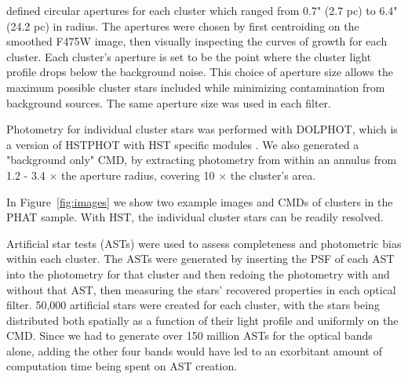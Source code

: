 \documentclass{emulateapj}
\begin{document}
\cite{Johnson15} defined circular apertures for each cluster which ranged from 0.7" (2.7 pc) to 6.4" (24.2 pc) in radius.  The apertures were chosen by first centroiding on the smoothed F475W image, then visually inspecting the curves of growth for each cluster.  Each cluster's aperture is set to be the point where the cluster light profile drops below the background noise.  This choice of aperture size allows the maximum possible cluster stars included while minimizing contamination from background sources.  The same aperture size was used in each filter.

Photometry for individual cluster stars was performed with DOLPHOT, which is a version of HSTPHOT with HST specific modules \citep{Dolphin00}.  We also generated a "background only" CMD, by extracting photometry from within an annulus from 1.2 - 3.4 $\times$ the aperture radius, covering 10 $\times$ the cluster's area.

In Figure~\ref{fig:images} we show two example images and CMDs of clusters in the PHAT sample.  With HST, the individual cluster stars can be readily resolved.


Artificial star tests (ASTs) were used to assess completeness and photometric bias within each cluster.  The ASTs were generated by inserting the PSF of each AST into the photometry for that cluster and then redoing the photometry with and without that AST, then measuring the stars' recovered properties in each optical filter.  50,000 artificial stars were created for each cluster, with the stars being distributed both spatially as a function of their light profile and uniformly on the CMD.  Since we had to generate over 150 million ASTs for the optical bands alone, adding the other four bands would have led to an exorbitant amount of computation time being spent on AST creation.
\end{document}
